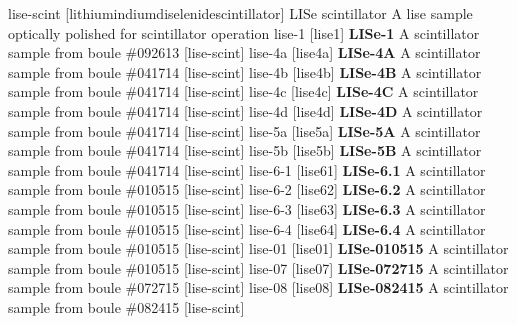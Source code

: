 \newglsXterm%
{lise-scint}%
[lithiumindiumdiselenidescintillator]%
{LISe scintillator}%
{A \gls{lise} sample optically polished for scintillator operation}%
\newglsXterm%
{lise-1}%
[lise1]%
{\textbf{LISe{\--}1}}%
{A scintillator sample from boule {\#}092613}%
[lise-scint]%
\newglsXterm%
{lise-4a}%
[lise4a]%
{\textbf{LISe{\--}4A}}%
{A scintillator sample from boule {\#}041714}%
[lise-scint]%
\newglsXterm%
{lise-4b}%
[lise4b]%
{\textbf{LISe{\--}4B}}%
{A scintillator sample from boule {\#}041714}%
[lise-scint]%
\newglsXterm%
{lise-4c}%
[lise4c]%
{\textbf{LISe{\--}4C}}%
{A scintillator sample from boule {\#}041714}%
[lise-scint]%
\newglsXterm%
{lise-4d}%
[lise4d]%
{\textbf{LISe{\--}4D}}%
{A scintillator sample from boule {\#}041714}%
[lise-scint]%
\newglsXterm%
{lise-5a}%
[lise5a]%
{\textbf{LISe{\--}5A}}%
{A scintillator sample from boule {\#}041714}%
[lise-scint]%
\newglsXterm%
{lise-5b}%
[lise5b]%
{\textbf{LISe{\--}5B}}%
{A scintillator sample from boule {\#}041714}%
[lise-scint]%
\newglsXterm%
{lise-6-1}%
[lise61]%
{\textbf{LISe{\--}6.1}}%
{A scintillator sample from boule {\#}010515}%
[lise-scint]%
\newglsXterm%
{lise-6-2}%
[lise62]%
{\textbf{LISe{\--}6.2}}%
{A scintillator sample from boule {\#}010515}%
[lise-scint]%
\newglsXterm%
{lise-6-3}%
[lise63]%
{\textbf{LISe{\--}6.3}}%
{A scintillator sample from boule {\#}010515}%
[lise-scint]%
\newglsXterm%
{lise-6-4}%
[lise64]%
{\textbf{LISe{\--}6.4}}%
{A scintillator sample from boule {\#}010515}%
[lise-scint]%
\newglsXterm%
{lise-01}%
[lise01]%
{\textbf{LISe{\--}010515}}%
{A scintillator sample from boule {\#}010515}%
[lise-scint]%
\newglsXterm%
{lise-07}%
[lise07]%
{\textbf{LISe{\--}072715}}%
{A scintillator sample from boule {\#}072715}%
[lise-scint]%
\newglsXterm%
{lise-08}%
[lise08]%
{\textbf{LISe{\--}082415}}%
{A scintillator sample from boule {\#}082415}%
[lise-scint]%